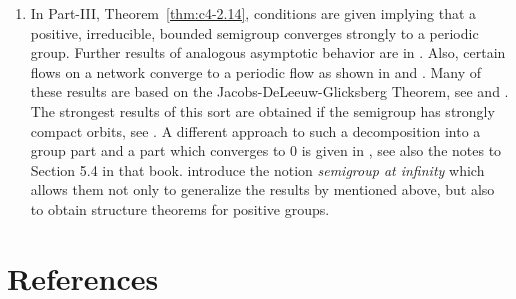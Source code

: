 \begin{enumerate}
 
\item 
In Part-III, Theorem~\ref{thm:c4-2.14}, conditions are given implying that  a positive, irreducible, bounded semigroup converges strongly to a periodic group. 
Further results of analogous asymptotic behavior are in \textcite{zbmath05262335}.
Also, certain flows on a network converge to a periodic flow as shown in \textcite{zbmath02146799} and \textcite{zbmath05598906}.
Many of these results are based on the Jacobs-DeLeeuw-Glicksberg Theorem, see  \textcite[Theorem  V.2.8]{zbmath01354832} and \textcite{zbmath06423122}.
The strongest results of this sort are obtained if the semigroup has strongly compact orbits, see  \textcite[Theorem V.2.14]{zbmath01354832}. 
A different approach to such a decomposition into a group part and a part which converges to $0$ is given in \textcite[Chapter V]{zbmath05842872}, see also the notes to Section 5.4 in that book.
\textcite{zbmath07201923} introduce the notion \emph{semigroup at infinity} which allows them not only to generalize the results by \textcite{zbmath07124949} mentioned above, but also to obtain structure theorems for positive groups. 


\end{enumerate}
\section*{References}
{\RaggedRight
  \printbibliography[heading=none]
 }